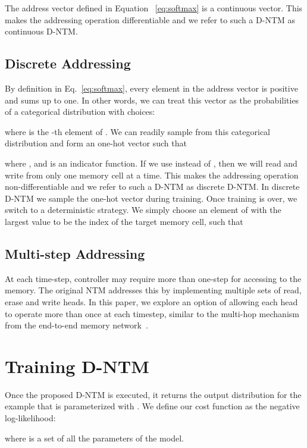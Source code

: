 \documentclass[12pt]{article}
\begin{document}
The address vector defined in Equation ~\eqref{eq:softmax} is a continuous vector. This makes the addressing operation differentiable and we refer to such a D-NTM as continuous D-NTM.

\subsection{Discrete Addressing}
\label{sec:gen_disc_add_vecs}

By definition in Eq.~\eqref{eq:softmax}, every element in the address
vector  is positive and sums up to one. In other words, we can treat this vector as
the probabilities of a categorical distribution  with  choices:

where  is the -th element of . We can readily sample from this
categorical distribution and form an one-hot vector  such that

where , and  is an indicator function. If we use  instead of , then we will read and write from only one memory cell at a time. This makes the addressing operation non-differentiable and we refer to such a D-NTM as discrete D-NTM. In discrete D-NTM we sample the one-hot vector during training. Once training is over, we switch to a deterministic strategy. We simply choose
an element of  with the largest value to be the index of the target memory
cell, such that



\subsection{Multi-step Addressing}

At each time-step, controller may require more than one-step for accessing to the memory. 
The original NTM addresses this by implementing multiple sets of read, erase and write heads.
In this paper, we explore an option of allowing each head to operate more than once at each
timestep, similar to the multi-hop mechanism from the end-to-end memory network~\citep{sukhbaatarend}. 


\section{Training D-NTM}
Once the proposed D-NTM is executed, it returns the output distribution  for the  example that is parameterized with . We define our cost function as the negative log-likelihood:

where  is a set of all the parameters of the model. 
\end{document}

